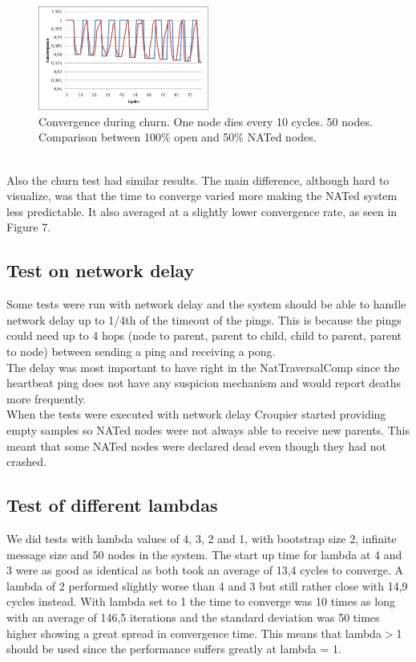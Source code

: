 \documentclass[10pt]{proc}
\begin{document}
\\[10pt]
\begin{figure}[h!]
\centering
\includegraphics[width=0.5\textwidth]{Fig7.png}
\caption{\label{fig.7}Convergence during churn. One node dies every 10 cycles. 50 nodes. Comparison between 100\% open and 50\% NATed nodes.}
\end{figure}
\\[10pt]
Also the churn test had similar results. The main difference, although hard to visualize, was that the time to converge varied more making the NATed system less predictable. It also averaged at a slightly lower convergence rate, as seen in Figure 7.
\subsection{Test on network delay}
Some tests were run with network delay and the system should be able to handle network delay up to 1/4th of the timeout of the pings. This is because the pings could need up to 4 hops (node to parent, parent to child, child to parent, parent to node) between sending a ping and receiving a pong. 
\\[10pt]
The delay was most important to have right in the NatTraversalComp since the heartbeat ping does not have any suspicion mechanism and would report deaths more frequently. 
\\[10pt]
When the tests were executed with network delay Croupier started providing empty samples so NATed nodes were not always able to receive new parents. This meant that some NATed nodes were declared dead even though they had not crashed.
\subsection{Test of different lambdas}
We did tests with lambda values of 4, 3, 2 and 1, with bootstrap size 2, infinite message size and 50 nodes in the system. The start up time for lambda at 4 and 3 were as good as identical as both took an average of 13,4 cycles to converge. A lambda of 2 performed slightly worse than 4 and 3 but still rather close with 14,9 cycles instead. With lambda set to 1 the time to converge was 10 times as long with an average of 146,5 iterations and the standard deviation was 50 times higher showing a great spread in convergence time. This means that lambda\(>\)1 should be used since the performance suffers greatly at lambda = 1.
\end{document}
